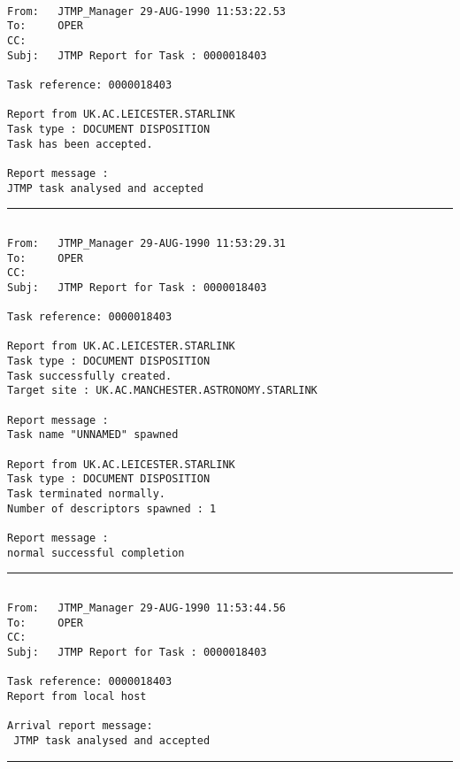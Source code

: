 \begin{verbatim}

From:   JTMP_Manager 29-AUG-1990 11:53:22.53
To:     OPER
CC:
Subj:   JTMP Report for Task : 0000018403

Task reference: 0000018403

Report from UK.AC.LEICESTER.STARLINK
Task type : DOCUMENT DISPOSITION
Task has been accepted.

Report message :
JTMP task analysed and accepted

\end{verbatim}
\rule{\textwidth}{0.5mm}
\begin{verbatim}

From:   JTMP_Manager 29-AUG-1990 11:53:29.31
To:     OPER
CC:
Subj:   JTMP Report for Task : 0000018403

Task reference: 0000018403

Report from UK.AC.LEICESTER.STARLINK
Task type : DOCUMENT DISPOSITION
Task successfully created.
Target site : UK.AC.MANCHESTER.ASTRONOMY.STARLINK

Report message :
Task name "UNNAMED" spawned

Report from UK.AC.LEICESTER.STARLINK
Task type : DOCUMENT DISPOSITION
Task terminated normally.
Number of descriptors spawned : 1

Report message :
normal successful completion

\end{verbatim}
\rule{\textwidth}{0.5mm}
\begin{verbatim}

From:   JTMP_Manager 29-AUG-1990 11:53:44.56
To:     OPER
CC:
Subj:   JTMP Report for Task : 0000018403

Task reference: 0000018403
Report from local host

Arrival report message:
 JTMP task analysed and accepted

\end{verbatim}
\rule{\textwidth}{0.5mm}


